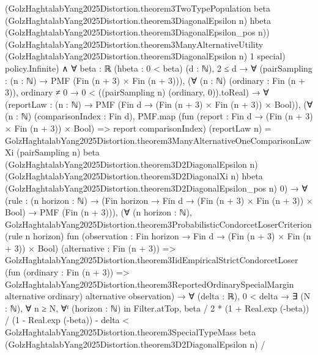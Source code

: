\documentclass[10pt]{article}
\begin{document}
\begin{ReviewVerbatim}
{                        (GolzHaghtalabYang2025Distortion.theorem3TwoTypePopulation beta
                          (GolzHaghtalabYang2025Distortion.theorem3DiagonalEpsilon n) hbeta
                          (GolzHaghtalabYang2025Distortion.theorem3DiagonalEpsilon_pos n))
                        (GolzHaghtalabYang2025Distortion.theorem3ManyAlternativeUtility
                          (GolzHaghtalabYang2025Distortion.theorem3DiagonalEpsilon n) 1 special)
                        policy}.Infinite) ∧
  ∀ {beta : ℝ} (hbeta : 0 < beta) (d : ℕ),
    2 ≤ d →
      ∀ (pairSampling : (n : ℕ) → PMF (Fin (n + 3) × Fin (n + 3))),
        (∀ (n : ℕ) (ordinary : Fin (n + 3)), ordinary ≠ 0 → 0 < ((pairSampling n) (ordinary, 0)).toReal) →
          ∀ (reportLaw : (n : ℕ) → PMF (Fin d → (Fin (n + 3) × Fin (n + 3)) × Bool)),
            (∀ (n : ℕ) (comparisonIndex : Fin d),
                PMF.map (fun (report : Fin d → (Fin (n + 3) × Fin (n + 3)) × Bool) => report comparisonIndex)
                    (reportLaw n) =
                  GolzHaghtalabYang2025Distortion.theorem3ManyAlternativeOneComparisonLawXi (pairSampling n) beta
                    (GolzHaghtalabYang2025Distortion.theorem3D2DiagonalEpsilon n)
                    (GolzHaghtalabYang2025Distortion.theorem3D2DiagonalXi n) hbeta
                    (GolzHaghtalabYang2025Distortion.theorem3D2DiagonalEpsilon_pos n) 0) →
              ∀
                (rule :
                  (n horizon : ℕ) → (Fin horizon → Fin d → (Fin (n + 3) × Fin (n + 3)) × Bool) → PMF (Fin (n + 3))),
                (∀ (n horizon : ℕ),
                    GolzHaghtalabYang2025Distortion.theorem3ProbabilisticCondorcetLoserCriterion (rule n horizon)
                      fun (observation : Fin horizon → Fin d → (Fin (n + 3) × Fin (n + 3)) × Bool)
                        (alternative : Fin (n + 3)) =>
                      GolzHaghtalabYang2025Distortion.theorem3IidEmpiricalStrictCondorcetLoser
                        (fun (ordinary : Fin (n + 3)) =>
                          GolzHaghtalabYang2025Distortion.theorem3ReportedOrdinarySpecialMargin alternative ordinary)
                        alternative observation) →
                  ∀ (delta : ℝ),
                    0 < delta →
                      ∃ (N : ℕ),
                        ∀ n ≥ N,
                          ∀ᶠ (horizon : ℕ) in Filter.atTop,
                            beta / 2 * (1 + Real.exp (-beta)) / (1 - Real.exp (-beta)) - delta <
                              GolzHaghtalabYang2025Distortion.theorem3SpecialTypeMass beta
                                  (GolzHaghtalabYang2025Distortion.theorem3D2DiagonalEpsilon n) /

\end{ReviewVerbatim}
\end{document}
